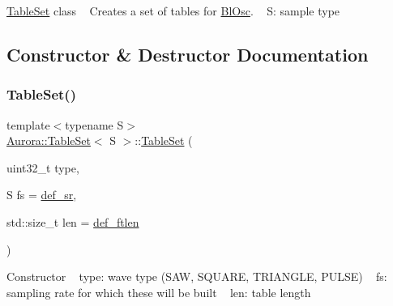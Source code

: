 \hyperlink{class_aurora_1_1_table_set}{Table\+Set} class ~\newline
Creates a set of tables for \hyperlink{class_aurora_1_1_bl_osc}{Bl\+Osc}. ~\newline
S\+: sample type 

\subsection{Constructor \& Destructor Documentation}
\mbox{\label{class_aurora_1_1_table_set_a0be4528b972606335d73ac312da6337b}} 
\subsubsection{\texorpdfstring{Table\+Set()}{TableSet()}\hspace{0.1cm}{\footnotesize\ttfamily [1/2]}}
{\footnotesize\ttfamily template$<$typename S$>$ \\
\hyperlink{class_aurora_1_1_table_set}{Aurora\+::\+Table\+Set}$<$ S $>$\+::\hyperlink{class_aurora_1_1_table_set}{Table\+Set} (\begin{DoxyParamCaption}\item[{uint32\+\_\+t}]{type,  }\item[{S}]{fs = {\ttfamily \hyperlink{namespace_aurora_ad49263d809bea98dd422e95bc91bc03e}{def\+\_\+sr}},  }\item[{std\+::size\+\_\+t}]{len = {\ttfamily \hyperlink{namespace_aurora_a14dabfd9feedfa09c0e6f86d2627f006}{def\+\_\+ftlen}} }\end{DoxyParamCaption})\hspace{0.3cm}{\ttfamily [inline]}}

Constructor ~\newline
type\+: wave type (S\+AW, S\+Q\+U\+A\+RE, T\+R\+I\+A\+N\+G\+LE, P\+U\+L\+SE) ~\newline
fs\+: sampling rate for which these will be built ~\newline
len\+: table length \mbox{\label{class_aurora_1_1_table_set_a884ecfde480fdac4c32fa10a82286941}} 
